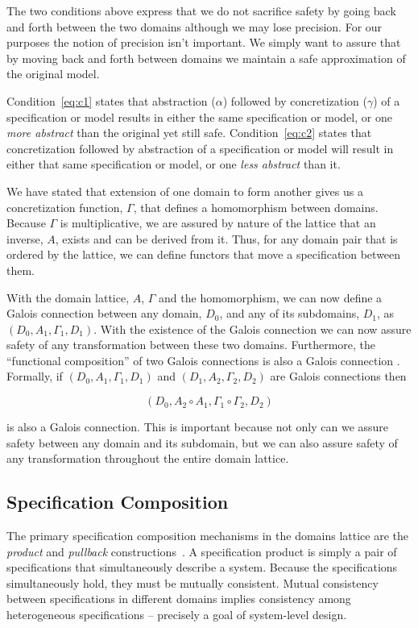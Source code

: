 \documentclass[12pt]{article}
\begin{document}
The two conditions above express that we do not sacrifice safety by
going back and forth between the two domains although we may lose
precision.  For our purposes the notion of precision isn't important.
We simply want to assure that by moving back and forth between domains
we maintain a safe approximation of the original model.

Condition~\ref{eq:c1} states that abstraction ($\alpha$) followed by
concretization ($\gamma$) of a specification or model results in
either the same specification or model, or one \emph{more abstract}
than the original yet still safe.  Condition~\ref{eq:c2} states that
concretization followed by abstraction of a specification or model will result
in either that same specification or model, or one \emph{less abstract} than
it.

We have stated that extension of one domain to form another gives us a
concretization function, $\Gamma$, that defines a homomorphism between
domains.  Because $\Gamma$ is multiplicative, we are assured by nature
of the lattice that an inverse, $A$, exists and can be derived from
it.  Thus, for any domain pair that is ordered by the lattice, we can
define functors that move a specification between them.

With the domain lattice, $A$, $\Gamma$ and the homomorphism, we can
now define a Galois connection between any domain, $D_0$, and any of
its subdomains, $D_1$, as $(D_0,A_1,\Gamma_1,D_1)$.  With the
existence of the Galois connection we can now assure safety of any
transformation between these two domains.  Furthermore, the
``functional composition'' of two Galois connections is also a Galois
connection \cite{Nielson:05:Principles-of-P}. Formally, if $(D_0, A_1,
\Gamma_1, D_1)$ and $(D_1, A_2, \Gamma_2,D_2)$ are Galois connections
then

\[(D_0, A_2 \circ A_1, \Gamma_1 \circ \Gamma_2, D_2)\]

\noindent is also a Galois connection.  This is important because not only
can we assure safety between any domain and its subdomain, but we can
also assure safety of any transformation throughout the entire domain
lattice.  

\subsection{Specification Composition}

The primary specification composition mechanisms in the domains
lattice are the \emph{product} and \emph{pullback}
constructions~\cite{Ehrig:85:Fundamentals-of}.  A specification
product is simply a pair of specifications that simultaneously
describe a system.  Because the specifications simultaneously hold,
they must be mutually consistent.  Mutual consistency between
specifications in different domains implies consistency among
heterogeneous specifications -- precisely a goal of system-level
design.
\end{document}
